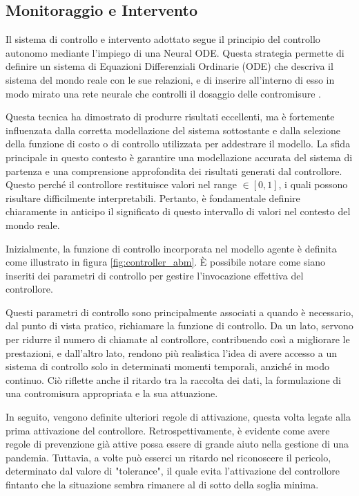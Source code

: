 \subsection{Monitoraggio e Intervento}
Il sistema di controllo e intervento adottato segue il principio 
del controllo autonomo mediante l'impiego di una Neural ODE. 
Questa strategia permette di definire un sistema di Equazioni 
Differenziali Ordinarie (ODE) che descriva il sistema del mondo 
reale con le sue relazioni, e di inserire all'interno di esso in 
modo mirato una rete neurale che controlli il dosaggio delle 
contromisure \cite{B_ttcher_2022} \cite{innes2019differentiable} 
\cite{sandoval2022neural}.

Questa tecnica ha dimostrato di produrre risultati eccellenti, 
ma è fortemente influenzata dalla corretta modellazione del sistema 
sottostante e dalla selezione della funzione di costo o di controllo 
utilizzata per addestrare il modello. La sfida principale in questo 
contesto è garantire una modellazione accurata del sistema di 
partenza e una comprensione approfondita dei risultati generati 
dal controllore. Questo perché il controllore restituisce valori 
nel range $\in [0, 1]$, i quali possono risultare difficilmente 
interpretabili. Pertanto, è fondamentale definire chiaramente in 
anticipo il significato di questo intervallo di valori nel contesto 
del mondo reale.

Inizialmente, la funzione di controllo incorporata nel modello 
agente è definita come illustrato in figura \ref{fig:controller_abm}. 
È possibile notare come siano inseriti dei parametri di controllo per 
gestire l'invocazione effettiva del controllore.

Questi parametri di controllo sono principalmente associati a quando 
è necessario, dal punto di vista pratico, richiamare la funzione di 
controllo. Da un lato, servono per ridurre il numero di chiamate al 
controllore, contribuendo così a migliorare le prestazioni, e 
dall'altro lato, rendono più realistica l'idea di avere accesso a 
un sistema di controllo solo in determinati momenti temporali, 
anziché in modo continuo. Ciò riflette anche il ritardo tra la 
raccolta dei dati, la formulazione di una contromisura appropriata 
e la sua attuazione.

In seguito, vengono definite ulteriori regole di attivazione, 
questa volta legate alla prima attivazione del controllore. 
Retrospettivamente, è evidente come avere regole di prevenzione 
già attive possa essere di grande aiuto nella gestione di una pandemia. 
Tuttavia, a volte può esserci un ritardo nel riconoscere il pericolo, 
determinato dal valore di "tolerance", il quale evita l'attivazione 
del controllore fintanto che la situazione sembra rimanere al di sotto 
della soglia minima.

